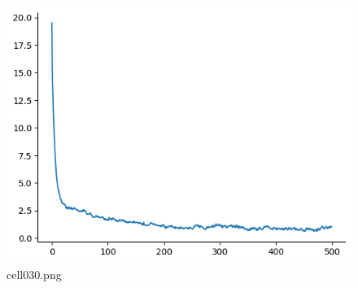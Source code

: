 \begin{figure}[ht]
	\centering
	\includegraphics[scale=0.8, max width=\linewidth]{./fig/bayesian-brain/mcmc/cell030.png}
	\caption{cell030.png}
	\label{cell030.png}
\end{figure}
